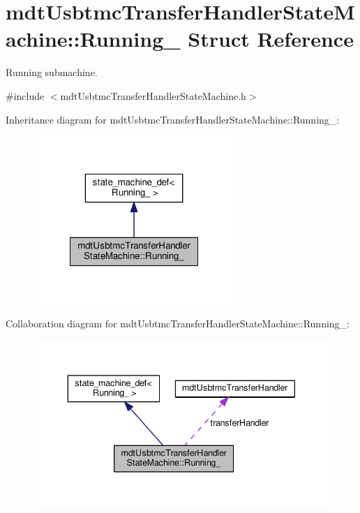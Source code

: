 \hypertarget{structmdt_usbtmc_transfer_handler_state_machine_1_1_running__}{\section{mdt\-Usbtmc\-Transfer\-Handler\-State\-Machine\-:\-:Running\-\_\- Struct Reference}
\label{structmdt_usbtmc_transfer_handler_state_machine_1_1_running__}
}


Running submachine.  




{\ttfamily \#include $<$mdt\-Usbtmc\-Transfer\-Handler\-State\-Machine.\-h$>$}



Inheritance diagram for mdt\-Usbtmc\-Transfer\-Handler\-State\-Machine\-:\-:Running\-\_\-\-:
\nopagebreak
\begin{figure}[H]
\begin{center}
\leavevmode
\includegraphics[width=216pt]{structmdt_usbtmc_transfer_handler_state_machine_1_1_running____inherit__graph}
\end{center}
\end{figure}


Collaboration diagram for mdt\-Usbtmc\-Transfer\-Handler\-State\-Machine\-:\-:Running\-\_\-\-:
\nopagebreak
\begin{figure}[H]
\begin{center}
\leavevmode
\includegraphics[width=339pt]{structmdt_usbtmc_transfer_handler_state_machine_1_1_running____coll__graph}
\end{center}
\end{figure}
